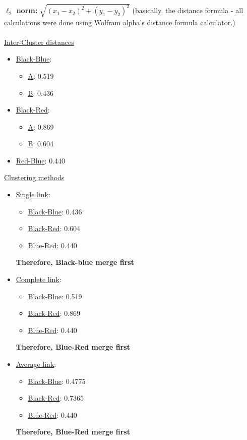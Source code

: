 \documentclass[submit]{harvardml}
\begin{document}
\noindent\textbf{$\ell_2$ norm:} $\sqrt{(x_1-x_2)^2 + (y_1-y_2)^2} $ (basically, the distance formula - all calculations were done using Wolfram alpha's distance formula calculator.)\\ \\
	\underline{Inter-Cluster distances}
	\begin{itemize}
		\item \underline{Black-Blue}:
			\begin{itemize}
				\item \underline{A}: 0.519
				\item \underline{B}: 0.436
			\end{itemize}
		\item \underline{Black-Red}:
			\begin{itemize}
				\item \underline{A}: 0.869
				\item  \underline{B}: 0.604
			\end{itemize}
		\item  \underline{Red-Blue}: 0.440
	\end{itemize}
	\underline{Clustering methods}
	\begin{itemize}
		\item \underline{Single link}:
			\begin{itemize}
				\item \underline{Black-Blue}: 0.436
				\item \underline{Black-Red}: 0.604
				\item \underline{Blue-Red}:  0.440
			\end{itemize}
		\textbf{Therefore, Black-blue merge first} 	
		\item  \underline{Complete link}:
			\begin{itemize}
				\item \underline{Black-Blue}: 0.519
				\item \underline{Black-Red}: 0.869
				\item \underline{Blue-Red}: 0.440
			\end{itemize}
		\textbf{Therefore, Blue-Red merge first}	
		\item  \underline{Average link}:
			\begin{itemize}
				\item \underline{Black-Blue}: 0.4775
				\item \underline{Black-Red}: 0.7365
				\item \underline{Blue-Red}: 0.440
			\end{itemize}		
		\textbf{Therefore, Blue-Red merge first}	
	\end{itemize}
\end{document}
